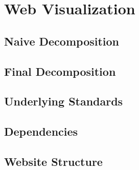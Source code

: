 \chapter{Web Visualization}
\label{chapter:web-visualization}

\section{Naive Decomposition}

\section{Final Decomposition}

\section{Underlying Standards}

\section{Dependencies}

\section{Website Structure}
